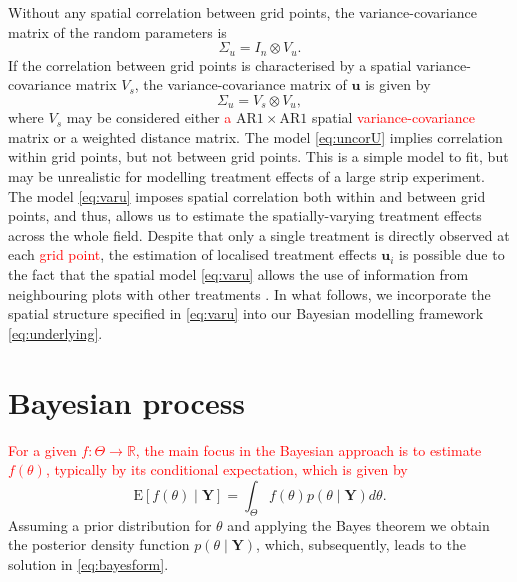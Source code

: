 \documentclass[a4paper]{article}   	%
\newcommand{\E}{\mathrm{E}}
\newcommand{\N}{\mathcal{N}}
\newcommand{\AR}{\mathrm{AR}1}
\begin{document}
	
	Without any spatial correlation between grid points, the variance-covariance matrix of the random parameters is
	\begin{equation}\label{eq:uncorU}
		\Sigma_u = I_n \otimes V_u.
	\end{equation}
	If the correlation between grid points is characterised by a spatial variance-covariance matrix $V_s$, the variance-covariance matrix of $\bm{u}$ is given by
	\begin{equation}\label{eq:varu}
		\Sigma_u = V_s \otimes V_u,
	\end{equation}
	where $V_s$ may be considered either \textcolor{red}{a} $\AR\times \AR$ spatial \textcolor{red}{variance-covariance}  matrix or a weighted distance matrix.
	The model \eqref{eq:uncorU} implies correlation within grid points, but not between grid points. This is a simple model to fit, but may be unrealistic for modelling treatment effects of a large strip experiment. The model \eqref{eq:varu} imposes spatial correlation both within and between grid points, and thus, allows us to estimate the spatially-varying treatment effects across the whole field. Despite that only a single treatment is directly observed at each \textcolor{red}{grid point}, the estimation of localised treatment effects $\bm{u}_i$ is possible due to the fact that the spatial model \eqref{eq:varu} allows the use of information from neighbouring plots with other treatments \parencite{Piepho2011Statistical}. In what follows, we incorporate the spatial structure specified in \eqref{eq:varu} into our Bayesian modelling framework \eqref{eq:underlying}. 
	
	
	\section{Bayesian process}\label{sec:bayes}
	\textcolor{red}{For a given $f:\Theta \rightarrow \mathbb{R}$, the main focus in the Bayesian approach is to estimate $f(\theta)$, typically by its conditional expectation, which is given by }
	\begin{equation}\label{eq:bayesform}
		\E[f(\theta)\mid \bm{Y}] = \int_{\Theta} f(\theta)p(\theta\mid \bm{Y})d\theta.
	\end{equation}
	 Assuming a prior distribution for $\theta$ and applying the Bayes theorem we obtain the posterior density function $p(\theta\mid \bm{Y})$, which, subsequently, leads to the solution in \eqref{eq:bayesform}. 
	
\end{document}

